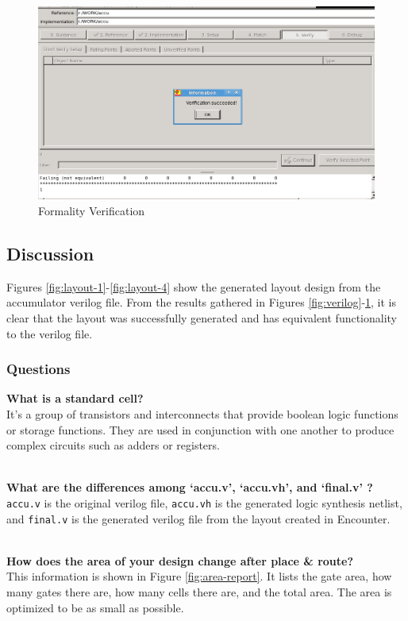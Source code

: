 \documentclass[12pt]{article}
\begin{document}
\begin{figure}[H]
\centering
\includegraphics[width=0.7\linewidth]{fm-verification}
\caption{Formality Verification}
\label{fig:fm-verification}
\end{figure}

\subsection{Discussion}
Figures \ref{fig:layout-1}-\ref{fig:layout-4} show the generated layout design from the accumulator verilog file. From the results gathered in Figures \ref{fig:verilog}-\ref{fig:fm-verification}, it is clear that the layout was successfully generated and has equivalent functionality to the verilog file.

\subsubsection{Questions}
\textbf{What is a standard cell?}\\
It's a group of transistors and interconnects that provide boolean logic functions or storage functions. They are used in conjunction with one another to produce complex circuits such as adders or registers.

~\\
\textbf{What are the differences among ‘accu.v’, ‘accu.vh’, and ‘final.v’ ?}\\
\texttt{accu.v} is the original verilog file, \texttt{accu.vh} is the generated logic synthesis netlist, and \texttt{final.v} is the generated verilog file from the layout created in Encounter.

~\\
\textbf{How does the area of your design change after place \& route?}\\
This information is shown in Figure \ref{fig:area-report}. It lists the gate area, how many gates there are, how many cells there are, and the total area. The area is optimized to be as small as possible.
\end{document}
